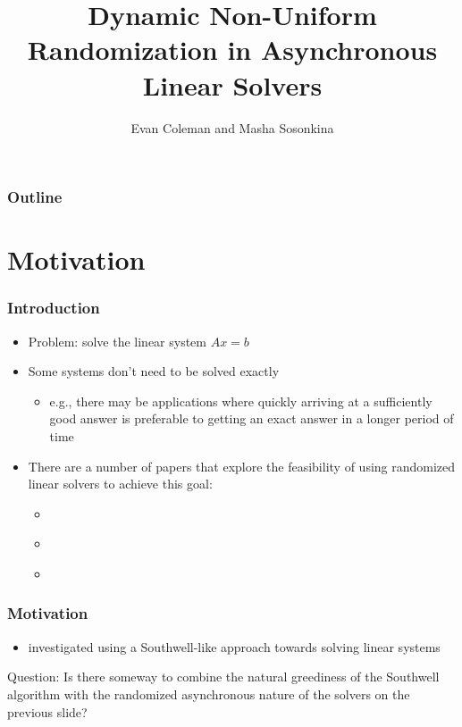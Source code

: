 \documentclass{beamer}
\title[Randomized Asynchronous Linear Solvers]{Dynamic Non-Uniform Randomization in Asynchronous Linear Solvers}
\author[Coleman \& Sosonkina]{Evan Coleman and Masha Sosonkina}
\date{}
\begin{document}
%
\begin{frame}
	\titlepage
\end{frame}


\begin{frame}
	\frametitle{Outline}
	\tableofcontents
\end{frame}

\section{Motivation}

\begin{frame}
	\frametitle{Introduction}
	\begin{itemize}
		\item Problem: solve the linear system $Ax = b$
		\item Some systems don't need to be solved exactly
		    \begin{itemize}
		        \item e.g., there may be applications where quickly arriving at a sufficiently good answer is preferable to getting an exact answer in a longer period of time
		    \end{itemize}
	    \item There are a number of papers that explore the feasibility of using randomized linear solvers to achieve this goal:
	        \begin{itemize}
	            \item \textcite{leventhal2010randomized}
	            \item \textcite{griebel2012greedy}
	            \item \textcite{avron2015revisiting}
	        \end{itemize}
	\end{itemize}	
\end{frame}

\begin{frame}
	\frametitle{Motivation}
	\begin{itemize}
		\item \textcite{wolfson2017distributed} investigated using a Southwell-like approach towards solving linear systems
	\end{itemize}	
	\begin{block}{Question:}
	    Is there someway to combine the natural greediness of the Southwell algorithm with the randomized asynchronous nature of the solvers on the previous slide?
	\end{block}
\end{frame}
\end{document}
